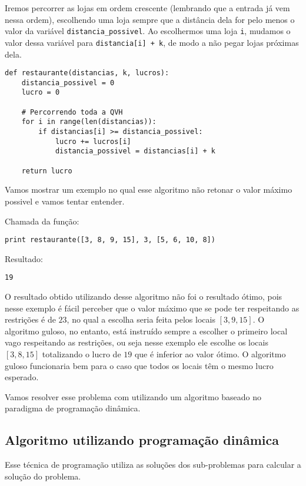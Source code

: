 \documentclass[11pt]{article}
\begin{document}
Iremos percorrer as lojas em ordem crescente (lembrando que a entrada
já vem nessa ordem), escolhendo uma loja sempre que a distância dela
for pelo menos o valor da variável \verb~distancia_possivel~. Ao escolhermos
uma loja \verb~i~, mudamos o valor dessa variável para \verb~distancia[i] + k~,
de modo a não pegar lojas próximas dela.

\begin{verbatim}
def restaurante(distancias, k, lucros):
    distancia_possivel = 0
    lucro = 0

    # Percorrendo toda a QVH
    for i in range(len(distancias)):
        if distancias[i] >= distancia_possivel:
            lucro += lucros[i]
            distancia_possivel = distancias[i] + k

    return lucro
\end{verbatim}


Vamos mostrar um exemplo no qual esse algoritmo não retonar o valor
máximo possivel e vamos tentar entender.


Chamada da função:

\begin{verbatim}
print restaurante([3, 8, 9, 15], 3, [5, 6, 10, 8])
\end{verbatim}

Resultado:

\begin{verbatim}
19
\end{verbatim}

O resultado obtido utilizando desse algoritmo não foi o resultado
ótimo, pois nesse exemplo é fácil perceber que o valor máximo que se
pode ter respeitando as restrições é de $23$, no qual a escolha seria
feita pelos locais $[3, 9, 15]$. O algoritmo guloso, no entanto, está
instruído sempre a escolher o primeiro local vago respeitando as
restrições, ou seja nesse exemplo ele escolhe os locais $[3, 8, 15]$
totalizando o lucro de $19$ que é inferior ao valor ótimo. O algoritmo
guloso funcionaria bem para o caso que todos os locais têm o mesmo
lucro esperado.

Vamos resolver esse problema com utilizando um algoritmo baseado no
paradigma de programação dinâmica.

\subsection{Algoritmo utilizando programação dinâmica}
\label{sec-3-2}

Esse técnica de programação utiliza as soluções dos sub-problemas para
calcular a solução do problema.
\end{document}
